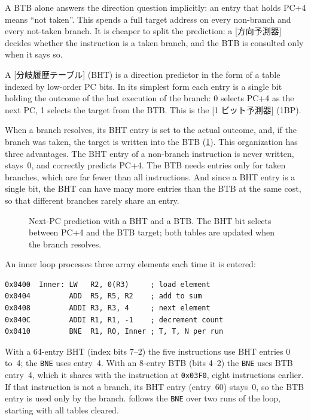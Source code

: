 \documentclass[../main.tex]{subfiles}
\begin{document}
A BTB alone answers the direction question implicitly: an entry that holds
PC+4 means \enquote{not taken}.
This spends a full target address on every non-branch and every not-taken
branch.  It is cheaper to split the prediction: a
[方向予測器] decides whether the instruction is a
taken branch, and the BTB is consulted only when it says so.

\begin{definition}
  A [分岐履歴テーブル]
  (BHT) is a direction predictor in the
  form of a table indexed by low-order PC bits.  In its simplest form each entry is a single
  bit holding the outcome of the last execution of the branch: 0 selects
  PC+4 as the next PC, 1 selects the target from the BTB.  This is the
  [1 ビット予測器]
  (1BP).
\end{definition}

When a branch resolves, its BHT entry is set to the actual outcome, and, if
the branch was taken, the target is written into the BTB
(\cref{fig:l04-bht-btb}).  This organization has three advantages.  The BHT
entry of a non-branch instruction is never written, stays~0, and correctly
predicts PC+4.  The BTB needs entries only for taken branches, which are far
fewer than all instructions.  And since a BHT entry is a single bit, the BHT
can have many more entries than the BTB at the same cost, so that different
branches rarely share an entry.

\begin{figure}[htbp]
  \centering
  
  \caption{Next-PC prediction with a BHT and a BTB.  The BHT bit selects
    between PC+4 and the BTB target; both tables are updated when the
    branch resolves.}
  \label{fig:l04-bht-btb}
\end{figure}

\begin{example}
  \label{ex:l04-1bp-trace}
  An inner loop processes three array elements each time it is entered:
  \begin{lstlisting}[language={[x86masm]Assembler}, numbers=none]
0x0400  Inner: LW   R2, 0(R3)     ; load element
0x0404         ADD  R5, R5, R2    ; add to sum
0x0408         ADDI R3, R3, 4     ; next element
0x040C         ADDI R1, R1, -1    ; decrement count
0x0410         BNE  R1, R0, Inner ; T, T, N per run
\end{lstlisting}
  With a 64-entry BHT (index bits 7--2) the five instructions use BHT
  entries 0 to~4; the \texttt{BNE} uses entry~4.  With an 8-entry BTB (bits
  4--2) the \texttt{BNE} uses BTB entry~4, which it shares with the
  instruction at \texttt{0x03F0}, eight instructions earlier.  If that
  instruction is not a branch, its BHT entry (entry~60) stays~0, so the BTB
  entry is used only by the branch.   follows the
  \texttt{BNE} over two runs of the loop, starting with all tables cleared.
\end{example}
\end{document}
